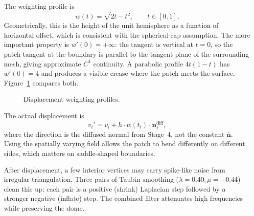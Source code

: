 The weighting profile is
\begin{equation}
w(t) = \sqrt{2t - t^2}, \qquad t \in [0, 1]. \label{eq:profile}
\end{equation}
Geometrically, this is the height of the unit hemisphere as a function of horizontal offset, which is consistent with the spherical-cap assumption. The more important property is $w'(0) = +\infty$: the tangent is vertical at $t = 0$, so the patch tangent at the boundary is parallel to the tangent plane of the surrounding mesh, giving approximate $C^1$ continuity. A parabolic profile $4t(1-t)$ has $w'(0) = 4$ and produces a visible crease where the patch meets the surface. Figure~\ref{fig:profile-comparison} compares both.

\begin{figure}[H]
    \centering
    \caption{Displacement weighting profiles.}
    \label{fig:profile-comparison}
\end{figure}

The actual displacement is
\begin{equation}
v_i' = v_i + h \cdot w(t_i) \cdot \mathbf{n}_i^{\text{diff}},
\end{equation}
where the direction is the diffused normal from Stage~4, not the constant $\bar{\mathbf{n}}$. Using the spatially varying field allows the patch to bend differently on different sides, which matters on saddle-shaped boundaries.

After displacement, a few interior vertices may carry spike-like noise from irregular triangulation. Three pairs of Taubin smoothing ($\lambda = 0.40, \mu = -0.44$) clean this up: each pair is a positive (shrink) Laplacian step followed by a stronger negative (inflate) step. The combined filter attenuates high frequencies while preserving the dome.

